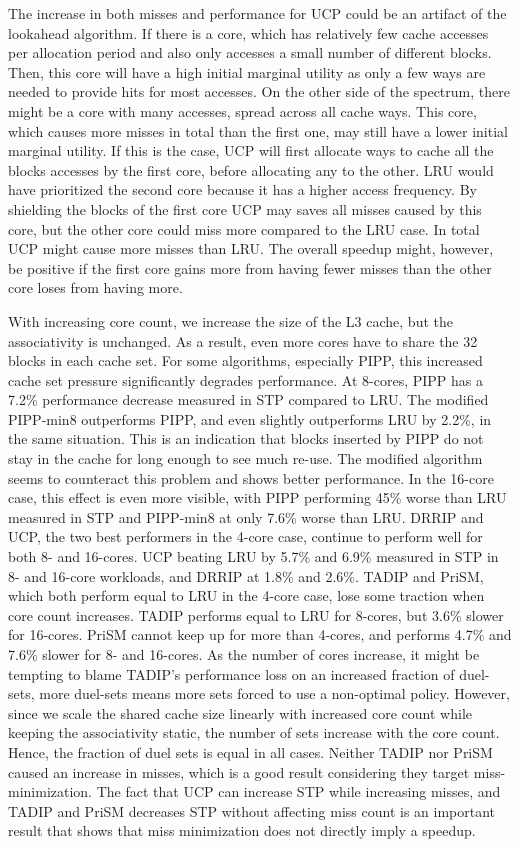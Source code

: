 The increase in both misses and performance for UCP could be an artifact of the lookahead algorithm.
If there is a core, which has relatively few cache accesses per allocation period and also only accesses a small number of different blocks.
Then, this core will have a high initial marginal utility as only a few ways are needed to provide hits for most accesses.
On the other side of the spectrum, there might be a core with many accesses, spread across all cache ways.
This core, which causes more misses in total than the first one, may still have a lower initial marginal utility.
If this is the case, UCP will first allocate ways to cache all the blocks accesses by the first core, before allocating any to the other.
LRU would have prioritized the second core because it has a higher access frequency.
By shielding the blocks of the first core UCP may saves all misses caused by this core, but the other core could miss more compared to the LRU case.
In total UCP might cause more misses than LRU.
The overall speedup might, however, be positive if the first core gains more from having fewer misses than the other core loses from having more.

With increasing core count, we increase the size of the L3 cache, but the associativity is unchanged.
As a result, even more cores have to share the 32 blocks in each cache set.
For some algorithms, especially PIPP, this increased cache set pressure significantly degrades performance.
At 8-cores, PIPP has a 7.2\% performance decrease measured in STP compared to LRU.
The modified PIPP-min8 outperforms PIPP, and even slightly outperforms LRU by 2.2\%, in the same situation.
This is an indication that blocks inserted by PIPP do not stay in the cache for long enough to see much re-use.
The modified algorithm seems to counteract this problem and shows better performance.
In the 16-core case, this effect is even more visible, with PIPP performing 45\% worse than LRU measured in STP and PIPP-min8 at only 7.6\% worse than LRU.
DRRIP and UCP, the two best performers in the 4-core case, continue to perform well for both 8- and 16-cores.
UCP beating LRU by 5.7\% and 6.9\% measured in STP in 8- and 16-core workloads, and DRRIP at 1.8\% and 2.6\%.
TADIP and PriSM, which both perform equal to LRU in the 4-core case, lose some traction when core count increases.
TADIP performs equal to LRU for 8-cores, but 3.6\% slower for 16-cores.
PriSM cannot keep up for more than 4-cores, and performs 4.7\% and 7.6\% slower for 8- and 16-cores.
As the number of cores increase, it might be tempting to blame TADIP's performance loss on an increased fraction of duel-sets, more duel-sets means more sets forced to use a non-optimal policy.
However, since we scale the shared cache size linearly with increased core count while keeping the associativity static, the number of sets increase with the core count.
Hence, the fraction of duel sets is equal in all cases.
Neither TADIP nor PriSM caused an increase in misses, which is a good result considering they target miss-minimization.
The fact that UCP can increase STP while increasing misses, and TADIP and PriSM decreases STP without affecting miss count is an important result that shows that miss minimization does not directly imply a speedup.

